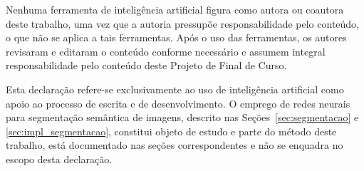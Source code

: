 \documentclass[
    12pt,
    openright,
    oneside,
    a4paper,
    english,
    brazil
]{abntex2}
\begin{document}
Nenhuma ferramenta de inteligência artificial figura como autora ou coautora deste trabalho, uma vez que a autoria pressupõe responsabilidade pelo conteúdo, o que não se aplica a tais ferramentas. Após o uso das ferramentas, os autores revisaram e editaram o conteúdo conforme necessário e assumem integral responsabilidade pelo conteúdo deste Projeto de Final de Curso.

Esta declaração refere-se exclusivamente ao uso de inteligência artificial como apoio ao processo de escrita e de desenvolvimento. O emprego de redes neurais para segmentação semântica de imagens, descrito nas Seções~\ref{sec:segmentacao} e \ref{sec:impl_segmentacao}, constitui objeto de estudo e parte do método deste trabalho, está documentado nas seções correspondentes e não se enquadra no escopo desta declaração.


\end{document}
